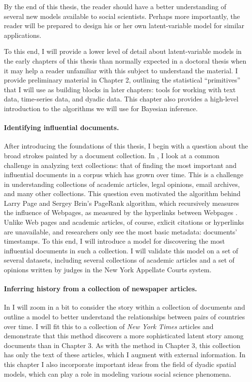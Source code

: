 By the end of this thesis, the reader should have a better
understanding of several new models available to social scientists.
Perhaps more importantly, the reader will be prepared to design his or
her own latent-variable model for similar applications.

To this end, I will provide a lower level of detail about
latent-variable models in the early chapters of this thesis than
normally expected in a doctoral thesis when it may help a reader
unfamiliar with this subject to understand the material.  I provide
preliminary material in Chapter 2, outlining the statistical
``primitives'' that I will use as building blocks in later chapters:
tools for working with text data, time-series data, and dyadic data.
This chapter also provides a high-level introduction to the algorithms
we will use for Bayesian inference.

\paragraph{Identifying influential documents.} After introducing the
foundations of this thesis, I begin with a question about the broad
strokes painted by a document collection. In , I
look at a common challenge in analyzing text collections: that of
finding the most important and influential documents in a corpus which
has grown over time.  This is a challenge in understanding collections
of academic articles, legal opinions, email archives, and many other
collections. This question even motivated the algorithm behind Larry
Page and Sergey Brin's PageRank algorithm, which recursively measures
the influence of Webpages, as measured by the hyperlinks between
Webpages \citep{garfield:1992,brin:1998,garfield:2002}.  Unlike Web
pages and academic articles, of course, exlicit citations or
hyperlinks are unavailable, and researchers only see the most basic
metadata: documents' timestamps.  To this end, I will introduce a
model for discovering the most influential documents in such a
collection. I will validate this model on a set of several datasets,
including several collections of academic articles and a set of
opinions written by judges in the New York Appellate Courts system.

\paragraph{Inferring history from a collection of newspaper articles.}
In  I will zoom in a bit to consider the
story within a collection of documents and outline a model to better
understand the relationships between pairs of countries over time.  I
will fit this to a collection of \emph{New York Times} articles and
demonstrate that this method discovers a more sophisticated latent
story among documents than in Chapter 3.  As with the method in Chapter
3, this collection has only the text of these articles, which I
augment with external information.  In this chapter I also incorporate
important ideas from the field of dyadic spatial models, which can
play a role in modeling various social science phenomena.


